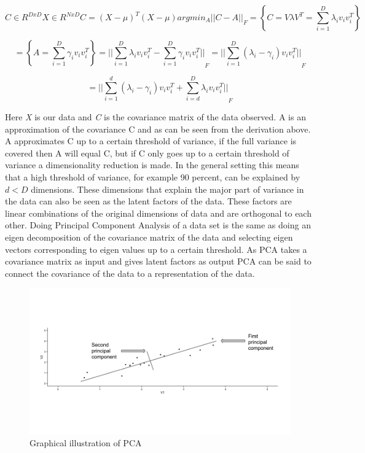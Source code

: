 \documentclass[a4paper,11pt]{kth-mag}
\begin{document}
\begin{equation}
C \in R^{D x D}
X \in R^{N x D} 
C = (X - \mu)^T (X - \mu)
argmin_A {||C - A||}_F = \left\{C = V \lambda V^T = \sum_{i=1}^{D}\lambda_i v_i v_i^T \right\} 
\end{equation}

\begin{equation}
= \left\{ A = \sum_{i=1}^{D}\gamma_i v_i v_i^T \right\} = {|| \sum_{i=1}^{D}\lambda_i v_i v_i^T - \sum_{i=1}^{D}\gamma_i  v_i v_i^T ||}_F = {|| \sum_{i=1}^{D}(\lambda_i - \gamma_i) v_i v_i^T ||}_F 
\end{equation}

\begin{equation}
= {|| \sum_{i=1}^{d}(\lambda_i - \gamma_i) v_i v_i^T + \sum_{i = d}^{D}\lambda_i v_i v_i^T ||}_F
\end{equation}

Here \textit{X} is our data and \textit{C} is the covariance matrix of the data observed. A is an approximation of the covariance C and as can be seen from the derivation above. A approximates C up to a certain threshold of variance, if the full variance is covered then A will equal C, but if C only goes up to a certain threshold of variance a dimensionality reduction is made. In the general setting this means that a high threshold of variance, for example 90 percent, can be explained by $d < D$ dimensions. These dimensions that explain the major part of variance in the data can also be seen as the latent factors of the data. These factors are linear combinations of the original dimensions of data and are orthogonal to each other. Doing Principal Component Analysis of a data set is the same as doing an eigen decomposition of the covariance matrix of the data and selecting eigen vectors corresponding to eigen values up to a certain threshold. As PCA takes a covariance matrix as input and gives latent factors as output PCA can be said to connect the covariance of the data to a representation of the data.

\begin{figure}
\includegraphics[scale=0.42]{images/pca.png}
\caption{Graphical illustration of PCA}
\end{figure}
\end{document}
